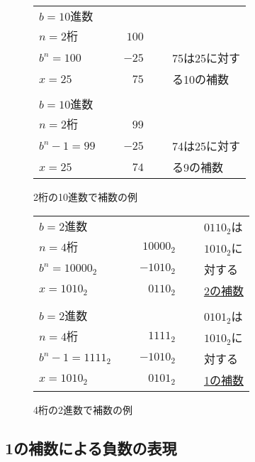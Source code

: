 \begin{figure}[tb]
\begin{center}
{\small\begin{tabular}{ l c r c l }
$b=10進数$    & ~ &       &   &              \\
$n=2桁$       & ~ & $100$ &   &              \\
$b^n = 100$   & ~ & $-25$ & ~ & 75は25に対す \\
\cline{3-3}
$x = 25$      &   &  $75$ &   & る10の補数   \\
              &   &       &   &        \\
$b=10進数$    & ~ &       &   &              \\
$n=2桁$       & ~ &  $99$ &   &              \\
$b^n-1 = 99$  & ~ & $-25$  & ~ & 74は25に対す \\
\cline{3-3}
$x = 25$      &   &  $74$ &   & る9の補数   \\
\end{tabular}}
\caption{2桁の10進数で補数の例}
\label{fig:chap2:sc10}
\end{center}
\end{figure}

\begin{figure}[tb]
\begin{center}
{\small\begin{tabular}{ l c r c l }
$b=2進数$       & ~ &          &   & $0110_2$は  \\ 
$n=4桁$         & ~ & $10000_2$ &   & $1010_2$に  \\
$b^n = 10000_2$ & ~ & $-1010_2$ & ~ & 対する      \\
\cline{3-3}
$x = 1010_2$    &   & $0110_2$  &   & \underline{2の補数} \\ 
                &   &           &   &            \\
$b=2進数$       & ~ &           &   & $0101_2$は \\
$n=4桁$         & ~ & $1111_2$  &   & $1010_2$に \\
$b^n-1 = 1111_2$& ~ & $-1010_2$  & ~ & 対する      \\
\cline{3-3}
$x = 1010_2$    &   & $0101_2$  &   & \underline{1の補数} \\
\end{tabular}}
\caption{4桁の2進数で補数の例}
\label{fig:chap2:sc2}
\end{center}
\end{figure}

\subsection{1の補数による負数の表現}


